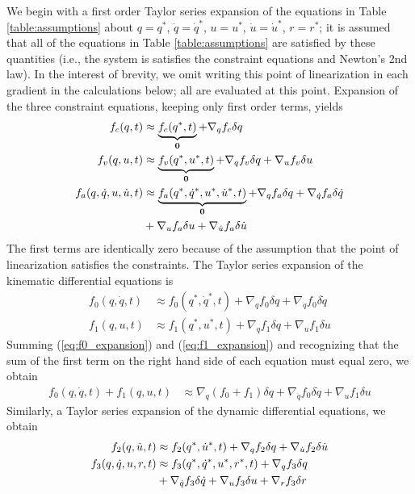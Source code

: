 We begin with a first order Taylor series expansion of the equations in Table
\ref{table:assumptions} about $q=q^*$, $\dot{q}=\dot{q}^*$, $u=u^*$,
$\dot{u}=\dot{u}^*$, $r=r^*$; it is assumed that all of the equations in Table
\ref{table:assumptions} are satisfied by these quantities (i.e., the system is
satisfies the constraint equations and Newton's 2nd law).  In the interest of
brevity, we omit writing this point of linearization in each gradient in the
calculations below; all are evaluated at this point. Expansion of the three
constraint equations, keeping only first order terms, yields
\begin{align}
  \label{eq:configuration_expansion}
  f_{c}(q, t) &\approx \underbrace{f_{c}(q^*, t)}_{\bm{0}} +
  \nabla_{q}f_{c} \delta q\\
  \label{eq:velocity_expansion}
  f_{v}(q, u, t) &\approx \underbrace{f_{v}(q^*,
  u^*, t)}_{\bm{0}} +  \nabla_{q}f_{v} \delta q +
  \nabla_{u}f_{v} \delta u \\
  \label{eq:acceleration_expansion}
  f_{a}(q, \dot{q}, u, \dot{u}, t) &\approx
  \underbrace{f_{a}(q^*, \dot{q}^*, u^*, \dot{u}^*,
t)}_{\bm{0}} +  \nabla_{q}f_{a} \delta q +
\nabla_{\dot{q}}f_{a}
 \delta \dot{q} \notag\\
&+ \nabla_{u}f_{a} \delta u + \nabla_{\dot{u}}f_{a}
\delta \dot{u}
\end{align}
The first terms are identically zero because of the assumption that the
point of linearization satisfies the constraints.  The Taylor series expansion
of the kinematic differential equations is
\begin{align}
  \label{eq:f0_expansion}
  f_{0}(q, \dot{q}, t) &\approx f_{0}(q^*,
  \dot{q}^*, t) + \nabla_{q}f_{0} \delta{q} +
  \nabla_{\dot{q}}f_{0} \delta\dot{q}\\
  \label{eq:f1_expansion}
  f_{1}(q, u, t) &\approx f_{1}(q^*,
  u^*, t) + \nabla_{q}f_{1} \delta{q} +
  \nabla_{u}f_{1} \delta{u}
\end{align}
Summing (\ref{eq:f0_expansion}) and (\ref{eq:f1_expansion}) and recognizing
that the sum of the first term on the right hand side of each equation must
equal zero, we obtain
\begin{align}
  \label{eq:f0_plus_f1_expansion}
  f_{0}(q, \dot{q}, t) + f_{1}(q, u, t) &\approx
  \nabla_{q}(f_{0} + f_{1}) \delta{q} +
  \nabla_{\dot{q}}f_{0} \delta\dot{q} +
  \nabla_{u}f_{1} \delta{u}
\end{align}
Similarly, a Taylor series expansion of the dynamic differential equations, we
obtain
\begin{align}
  \label{eq:f2_expansion}
  f_{2}(q, \dot{u}, t) &\approx
      f_{2}(q^*, \dot{u}^*, t) +
      \nabla_{q}f_{2} \delta{q}
      + \nabla_{\dot{u}}f_{2} \delta\dot{u}\\
  f_{3}(q, \dot{q}, u, r, t) &\approx
  f_{3}(q^*, \dot{q}^*, u^*, r^*, t) +
  \nabla_{q}f_{3} \delta{q}\notag\\
  \label{eq:f3_expansion}
  &+ \nabla_{\dot{q}}f_{3} \delta\dot{q}
  + \nabla_{u}f_{3} \delta u
  + \nabla_{r}f_{3} \delta{r}
\end{align}
